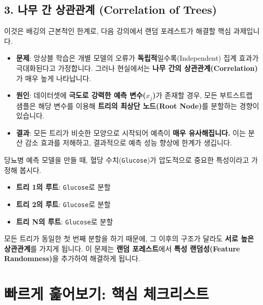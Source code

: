 \documentclass[11pt,a4paper]{book}
\theoremstyle{definition}
\begin{document}
\subsection{3. 나무 간 상관관계 (Correlation of Trees)}

이것은 배깅의 근본적인 한계로, 다음 강의에서 랜덤 포레스트가 해결할 핵심 과제입니다.

\begin{itemize}
    \item \textbf{문제}: 앙상블 학습은 개별 모델의 오류가 \textbf{독립적}일수록(Independent) 집계 효과가 극대화된다고 가정합니다. 그러나 현실에서는 \textbf{나무 간의 상관관계(Correlation)}가 매우 높게 나타납니다.
    \item \textbf{원인}: 데이터셋에 \textbf{극도로 강력한 예측 변수($x_j$)}가 존재할 경우, 모든 부트스트랩 샘플은 해당 변수를 이용해 \textbf{트리의 최상단 노드(Root Node)}를 분할하는 경향이 있습니다.
    \item \textbf{결과}: 모든 트리가 비슷한 모양으로 시작되어 예측이 \textbf{매우 유사해집니다.} 이는 분산 감소 효과를 저해하고, 결과적으로 예측 성능 향상에 한계가 생깁니다.
\end{itemize}

\begin{examplebox}[title={트리의 상관관계 예시}]
당뇨병 예측 모델을 만들 때, 혈당 수치(\texttt{Glucose})가 압도적으로 중요한 특성이라고 가정해 봅시다.

\begin{itemize}
    \item \textbf{트리 1의 루트}: \texttt{Glucose}로 분할
    \item \textbf{트리 2의 루트}: \texttt{Glucose}로 분할
    \item \textbf{트리 N의 루트}: \texttt{Glucose}로 분할
\end{itemize}
모든 트리가 동일한 첫 번째 분할을 하기 때문에, 그 이후의 구조가 달라도 \textbf{서로 높은 상관관계}를 가지게 됩니다. 이 문제는 \textbf{랜덤 포레스트}에서 \textbf{특성 랜덤성(Feature Randomness)}을 추가하여 해결하게 됩니다.
\end{examplebox}


\section{빠르게 훑어보기: 핵심 체크리스트}
\end{document}
